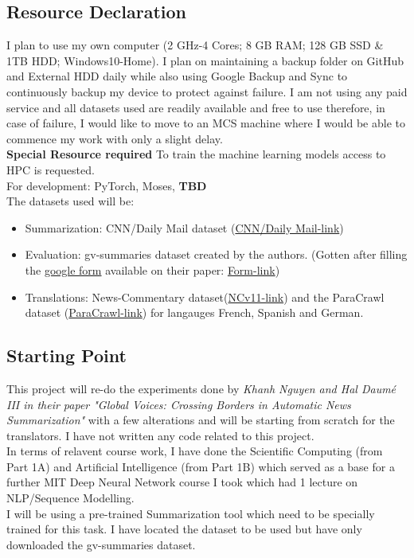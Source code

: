 \documentclass[12pt, a4paper]{article}
\begin{document}
\subsection*{Resource Declaration}
I plan to use my own computer (2 GHz-4 Cores; 8 GB RAM; 128 GB SSD \& 1TB HDD; Windows10-Home). I plan on maintaining a backup folder on GitHub and External HDD daily while also using Google Backup and Sync to continuously backup my device to protect against failure. I am not using any paid service and all datasets used are readily available and free to use therefore, in case of failure, I would like to move to an MCS machine where I would be able to commence my work with only a slight delay.
\\
\textbf{Special Resource required}
To train the machine learning models access to HPC is requested. 
\\
For development: PyTorch, Moses, \textbf{TBD}
\\
The datasets used will be: 
\begin{itemize}
  \item Summarization: CNN/Daily Mail dataset (\href{https://github.com/abisee/cnn-dailymail}{CNN/Daily Mail-link})
  \item Evaluation: gv-summaries dataset created by the authors. (Gotten after filling the \href{https://github.com/abisee/cnn-dailymail}{google form} available on their paper: \href{https://forms.gle/gpkJDT6RJWHM1Ztz9}{Form-link})
  \item Translations: News-Commentary dataset(\href{http://opus.nlpl.eu/News-Commentary-v11.php}{NCv11-link}) and the ParaCrawl dataset (\href{http://opus.nlpl.eu/ParaCrawl.php}{ParaCrawl-link}) for langauges French, Spanish and German.
\end{itemize}
 

\subsection*{Starting Point}
This project will re-do the experiments done by \textit{Khanh Nguyen and Hal Daumé III in their paper "Global Voices: Crossing Borders in Automatic News Summarization"} with a few alterations and will be starting from scratch for the translators. I have not written any code related to this project. \\
In terms of relavent course work, I have done the Scientific Computing (from Part 1A) and Artificial Intelligence (from Part 1B) which served as a base for a further MIT Deep Neural Network course I took which had 1 lecture on NLP/Sequence Modelling. \\
I will be using a pre-trained Summarization tool which need to be specially trained for this task. I have located the dataset to be used but have only downloaded the gv-summaries dataset.   
\end{document}
